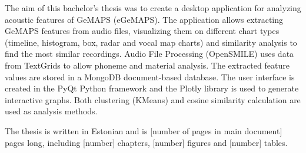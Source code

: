 The aim of this bachelor's thesis was to create a desktop application for analyzing acoustic features of GeMAPS (eGeMAPS). The application allows extracting GeMAPS features from audio files, visualizing them on different chart types (timeline, histogram, box, radar and vocal map charts) and similarity analysis to find the most similar recordings. Audio File Processing (OpenSMILE) uses data from TextGrids to allow phoneme and material analysis. The extracted feature values are stored in a MongoDB document-based database. The user interface is created in the PyQt Python framework and the Plotly library is used to generate interactive graphs. Both clustering (KMeans) and cosine similarity calculation are used as analysis methods.

The thesis is written in Estonian and is [number of pages in main document] pages long, including [number] chapters, [number] figures and [number] tables.
